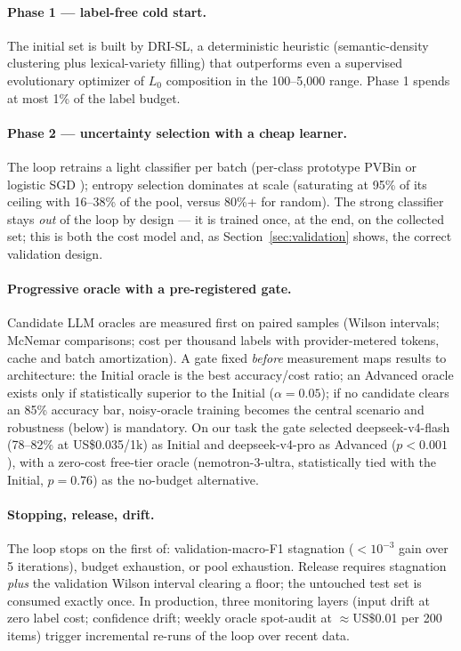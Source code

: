 \documentclass[11pt]{article}
\begin{document}
\paragraph{Phase 1 --- label-free cold start.} The initial set is built by
DRI-SL, a deterministic heuristic (semantic-density clustering plus
lexical-variety filling) that outperforms even a supervised evolutionary
optimizer of $L_0$ composition in the 100--5{,}000 range. Phase 1 spends
at most 1\% of the label budget.

\paragraph{Phase 2 --- uncertainty selection with a cheap learner.} The
loop retrains a light classifier per batch (per-class prototype PVBin or
logistic SGD \citep{Daru2024Dissertacao}); entropy selection dominates at
scale (saturating at 95\% of its ceiling with 16--38\% of the pool,
versus 80\%+ for random). The strong classifier stays \emph{out} of the
loop by design --- it is trained once, at the end, on the collected set;
this is both the cost model and, as Section~\ref{sec:validation} shows,
the correct validation design.

\paragraph{Progressive oracle with a pre-registered gate.} Candidate LLM
oracles are measured first on paired samples (Wilson intervals; McNemar
comparisons; cost per thousand labels with provider-metered tokens,
cache and batch amortization). A gate fixed \emph{before} measurement
maps results to architecture: the Initial oracle is the best
accuracy/cost ratio; an Advanced oracle exists only if statistically
superior to the Initial ($\alpha=0.05$); if no candidate clears an 85\%
accuracy bar, noisy-oracle training becomes the central scenario and
robustness (below) is mandatory. On our task the gate selected
deepseek-v4-flash (78--82\% at US\$0.035/1k) as Initial and
deepseek-v4-pro as Advanced ($p<0.001$), with a zero-cost free-tier
oracle (nemotron-3-ultra, statistically tied with the Initial,
$p=0.76$) as the no-budget alternative.

\paragraph{Stopping, release, drift.} The loop stops on the first of:
validation-macro-F1 stagnation ($<10^{-3}$ gain over 5 iterations),
budget exhaustion, or pool exhaustion. Release requires stagnation
\emph{plus} the validation Wilson interval clearing a floor; the
untouched test set is consumed exactly once. In production, three
monitoring layers (input drift at zero label cost; confidence drift;
weekly oracle spot-audit at $\approx$US\$0.01 per 200 items) trigger
incremental re-runs of the loop over recent data.
\end{document}
